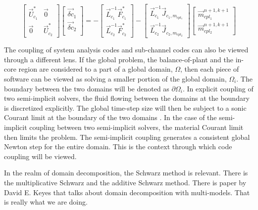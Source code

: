 \begin{equation}
\label{eqn:coupling_6}
\begin{bmatrix} 
\vec{U}^{*}_{c_1} & \vec{0} \\
\vec{0} & \vec{U}^{*}_{c_2} 
\end{bmatrix} 
\begin{bmatrix}
\vec{\delta c}_{1} \\
\vec{\delta c}_{2} \\
\end{bmatrix}  =
-\begin{bmatrix}
\vec{L}^{-1}_{c_1}\vec{F}^{*}_{c_1}\\
\vec{L}^{-1}_{c_2}\vec{F}^{*}_{c_2}  
\end{bmatrix} -
\begin{bmatrix}
\vec{L}^{-1}_{c_1}\vec{J}_{c_1,m_{cpl_1}} \\ \vec{L}^{-1}_{c_2}\vec{J}_{c_2,m_{cpl_2}}
\end{bmatrix}
\begin{bmatrix}
\vec{m}^{n+1,k+1}_{cpl_1} \\ \vec{m}^{n+1,k+1}_{cpl_2}
\end{bmatrix}
\end{equation}

The coupling of system analysis codes and sub-channel codes can also be viewed through a different lens.
If the global problem, the balance-of-plant and the in-core region are considered to a part of a global domain, $\Omega$, then each piece of software can be viewed as solving a smaller portion of the global domain, $\Omega_i$.
The boundary between the two domains will be denoted as $\partial \Omega_i$.
In explicit coupling of two semi-implicit solvers, the fluid flowing between the domains at the boundary is discretized explicitly.
The global time-step size will then be subject to a sonic Courant limit at the boundary of the two domains \cite{Aumiller2001}.
In the case of the semi-implicit coupling between two semi-implicit solvers, the material Courant limit then limits the problem.
The semi-implicit coupling generates a consistent global Newton step for the entire domain.
This is the context through which code coupling will be viewed.


In the realm of domain decomposition, the Schwarz method is relevant.
There is the multiplicative Schwarz and the additive Schwarz method.
There is paper by David E. Keyes that talks about domain decomposition with multi-models.
That is really what we are doing.

